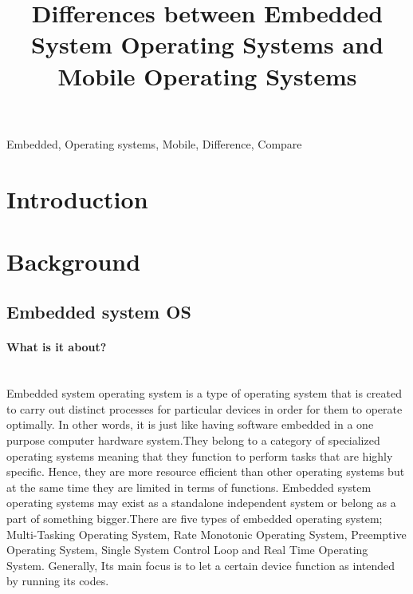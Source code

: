 \documentclass[conference]{IEEEtran}
\begin{document}
\title{Differences between Embedded System Operating Systems and Mobile Operating Systems\\
}



\maketitle

\begin{abstract}
\end{abstract}

\begin{IEEEkeywords}
Embedded, Operating systems, Mobile, Difference, Compare
\end{IEEEkeywords}

\section{Introduction}

\section{Background}
\subsection{Embedded system OS}

\paragraph{What is it about?}\mbox{} \\
Embedded system operating system is a type of operating system that is created to carry out distinct processes for particular devices in order for them to operate optimally. In other words, it is just like having software embedded in a one purpose computer hardware system.They belong to a category of specialized operating systems meaning that they function to perform tasks that are highly specific. Hence, they are more resource efficient than other operating systems but at the same time they are limited in terms of functions. Embedded system operating systems may exist as a standalone independent system or belong as a part of something bigger.There are five types of embedded operating system; Multi-Tasking Operating System, Rate Monotonic Operating System, Preemptive Operating System, Single System Control Loop and Real Time Operating System. Generally, Its main focus is to let a certain device function as intended by running its codes.\\
\end{document}
